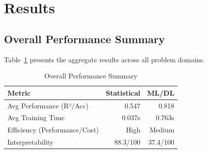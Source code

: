 \documentclass[11pt,a4paper]{article}
\begin{document}



\section{Results}

\subsection{Overall Performance Summary}

Table~\ref{tab:overall_summary} presents the aggregate results across all problem domains.

\begin{table}[h]
\centering
\begin{tabular}{lrr}
\toprule
\textbf{Metric} & \textbf{Statistical} & \textbf{ML/DL} \\
\midrule
Avg Performance (R²/Acc) & 0.547 & \textcolor{mlcolor}{0.818} \\
Avg Training Time & \textcolor{statcolor}{0.037s} & 0.763s \\
Efficiency (Performance/Cost) & \textcolor{accentcolor}{High} & Medium \\
Interpretability & \textcolor{accentcolor}{88.3/100} & 37.4/100 \\
\bottomrule
\end{tabular}
\caption{Overall Performance Summary}
\label{tab:overall_summary}
\end{table}

\end{document}
